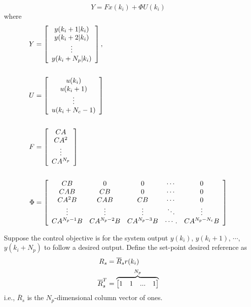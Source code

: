             \begin{equation}
                \label{eq:Matrix1}
                Y = Fx(k_i) + \Phi U(k_i)
            \end{equation}
            where
            \begin{equation}
                \aligned
                    Y &= \left [ \begin{array}{c} y(k_i+1|k_i) \\ y(k_i+2|k_i)\\\vdots \\ y(k_i+N_{p}|k_i) \end{array}  \right ], \\ \\
                    U &=\left [  \begin{array}{c} u(k_i) \\ u(k_i+1) \\\vdots \\ u(k_i+N_{c}-1) \end{array}  \right ]\\ \\
                    F &= \left [ \begin{array}{c}CA \\ CA^{2}\\\vdots \\ CA^{N_{p}} \end{array}  \right ]\\ \\
                    \Phi &= \left [ \begin{array}{ccccc}
                         CB & 0 & 0 & \cdots & 0 \\
                         CAB & CB & 0 & \cdots & 0 \\
                         CA^{2}B & CAB & CB & \cdots & 0 \\
                         \vdots & \vdots & \vdots & \ddots & \vdots \\
                         CA^{N_{p}-1}B & CA^{N_{p}-2}B & CA^{N_{p}-3}B & \cdots. &  CA^{N_{p}-N_{c}} B \end{array}  \right ]
                \endaligned
            \end{equation}
            
            Suppose the control objective is for the system output $y(k_i)$, $y(k_i+1)$, $\cdots$, $y(k_i+N_p)$ to follow a desired output. Define the set-point desired reference as
            \begin{equation}
                \label{eq:mpc5}
                \aligned
                    R_s &= \overline{R}_s r(k_i)\\
                    \overline R_s^T &= \overset{N_p}{\overbrace{\begin{bmatrix} 1& 1 & ... & 1 \end{bmatrix}}}
                \endaligned
            \end{equation}
            i.e., $\overline R_s$ is the $N_p$-dimensional column vector of ones.
            
